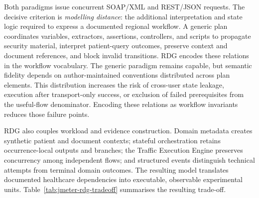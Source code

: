 \noindent Both paradigms issue concurrent SOAP/XML and REST/JSON requests. The
decisive criterion is \emph{modelling distance}: the additional interpretation
and state logic required to express a documented regional workflow. A generic
plan coordinates variables, extractors, assertions, controllers, and scripts to
propagate security material, interpret patient-query outcomes, preserve context
and document references, and block invalid transitions. RDG encodes these
relations in the workflow vocabulary. The generic paradigm remains capable, but
semantic fidelity depends on author-maintained conventions distributed across
plan elements. This distribution increases the risk of cross-user state leakage,
execution after transport-only success, or exclusion of failed prerequisites
from the useful-flow denominator. Encoding these relations as workflow
invariants reduces those failure points.

\noindent RDG also couples workload and evidence construction. Domain metadata
creates synthetic patient and document contexts; stateful orchestration retains
occurrence-local outputs and branches; the Traffic Execution Engine preserves
concurrency among independent flows; and structured events distinguish
technical attempts from terminal domain outcomes. The resulting model translates
documented healthcare dependencies into executable, observable experimental
units. Table~\ref{tab:jmeter-rdg-tradeoff} summarises the resulting trade-off.


